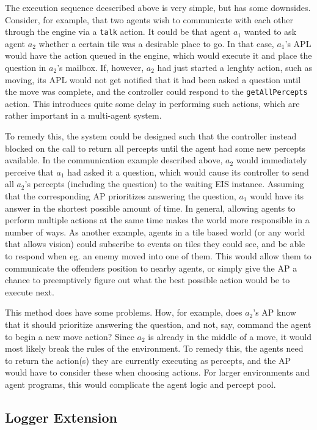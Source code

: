 The execution sequence deescribed above is very simple, but has some
downsides. Consider, for example, that two agents wish to communicate
with each other through the engine via a \texttt{talk} action. It
could be that agent $a_{1}$ wanted to ask agent $a_{2}$ whether
a certain tile was a desirable place to go. In that case, $a_{1}$'s
APL would have the action queued in the engine, which would execute
it and place the question in $a_{2}$'s mailbox. If, however, $a_{2}$
had just started a lenghty action, such as moving, its APL would not
get notified that it had been asked a question until the move was
complete, and the controller could respond to the \texttt{getAllPercepts}
action. This introduces quite some delay in performing such actions,
which are rather important in a multi-agent system. 

To remedy this, the system could be designed such that the controller
instead blocked on the call to return all percepts until the agent
had some new percepts available. In the communication example described
above, $a_{2}$ would immediately perceive that $a_{1}$ had asked
it a question, which would cause its controller to send all $a_{2}$'s
percepts (including the question) to the waiting EIS instance. Assuming
that the corresponding AP prioritizes answering the question, $a_{1}$
would have its answer in the shortest possible amount of time. In
general, allowing agents to perform multiple actions at the same time
makes the world more responsible in a number of ways. As another example,
agents in a tile based world (or any world that allows vision) could
subscribe to events on tiles they could see, and be able to respond
when eg. an enemy moved into one of them. This would allow them to
communicate the offenders position to nearby agents, or simply give
the AP a chance to preemptively figure out what the best possible
action would be to execute next.

This method does have some problems. How, for example, does $a_{2}$'s
AP know that it should prioritize answering the question, and not,
say, command the agent to begin a new move action? Since $a_{2}$
is already in the middle of a move, it would most likely break the
rules of the environment. To remedy this, the agents need to return
the action(s) they are currently executing as percepts, and the AP
would have to consider these when choosing actions. For larger environments
and agent programs, this would complicate the agent logic and percept
pool.


\subsection{Logger Extension}

